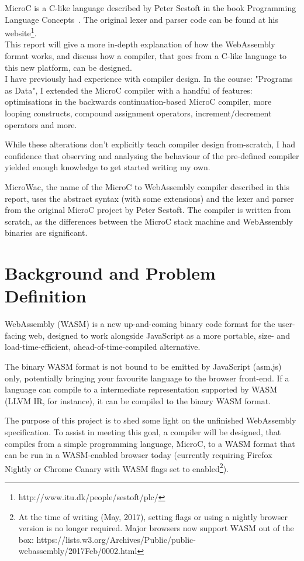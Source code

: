 \documentclass[a4paper]{article}
\begin{document}
MicroC is a C-like language described by Peter Sestoft in the book Programming Language Concepts~\cite{PLC}. The original lexer and parser code can be found at his website\footnote{http://www.itu.dk/people/sestoft/plc/}.\\

This report will give a more in-depth explanation of how the WebAssembly format works, and discuss how a compiler, that goes from a C-like language to this new platform, can be designed.\\

I have previously had experience with compiler design. In the course: "Programs as Data", I extended the MicroC compiler with a handful of features: optimisations in the backwards continuation-based MicroC compiler, more looping constructs, compound assignment operators, increment/decrement operators and more.

While these alterations don't explicitly teach compiler design from-scratch, I had confidence that observing and analysing the behaviour of the pre-defined compiler yielded enough knowledge to get started writing my own.

MicroWac, the name of the MicroC to WebAssembly compiler described in this report, uses the abstract syntax (with some extensions) and the lexer and parser from the original MicroC project by Peter Sestoft. The compiler is written from scratch, as the differences between the MicroC stack machine and WebAssembly binaries are significant.

\section{Background and Problem Definition}
\label{sec:problem-definition}
WebAssembly (WASM) is a new up-and-coming binary code format for the user-facing web, designed to work alongside JavaScript as a more portable, size- and load-time-efficient, ahead-of-time-compiled alternative. 

The binary WASM format is not bound to be emitted by JavaScript (asm.js) only, potentially bringing your favourite language to the browser front-end. If a language can compile to a intermediate representation supported by WASM (LLVM IR, for instance), it can be compiled to the binary WASM format. 

The purpose of this project is to shed some light on the unfinished WebAssembly specification. To assist in meeting this goal, a compiler will be designed, that compiles from a simple programming language, MicroC, to a WASM format that can be run in a WASM-enabled browser today (currently requiring Firefox Nightly or Chrome Canary with WASM flags set to enabled\footnote{At the time of writing (May, 2017), setting flags or using a nightly browser version is no longer required. Major browsers now support WASM out of the box: https://lists.w3.org/Archives/Public/public-webassembly/2017Feb/0002.html}).
\end{document}
